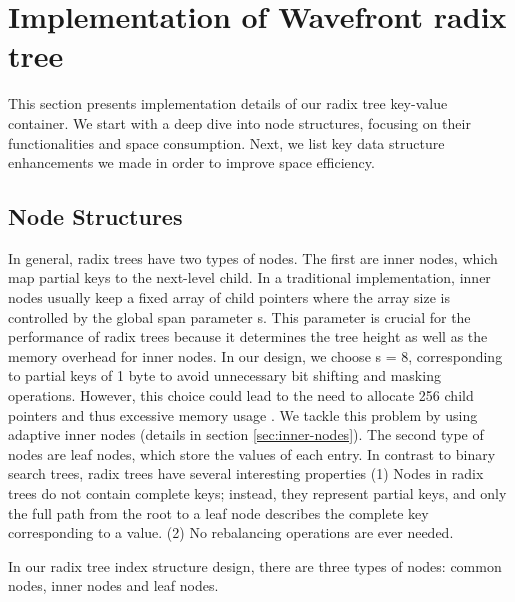 \documentclass[sigplan,screen,nonacm]{acmart}
\begin{document}
\section{Implementation of Wavefront radix tree}
This section presents implementation details of our radix tree key-value container. We start with a deep dive into node structures, focusing on their functionalities and space consumption. Next, we list key data structure enhancements we made in order to improve space efficiency.

\subsection{Node Structures}
In general, radix trees have two types of nodes. The first are inner nodes, which map partial keys to the next-level child. In a traditional implementation, inner nodes usually keep a fixed array of child pointers where the array size is controlled by the global span parameter s. This parameter is crucial for the performance of radix trees because it determines the tree height as well as the memory overhead for inner nodes. In our design, we choose s = 8, corresponding to partial keys of 1 byte to avoid unnecessary bit shifting and masking operations. However, this choice could lead to the need to allocate 256 child pointers and thus excessive memory usage \cite{boehm2011efficient}.  We tackle this problem by using adaptive inner nodes (details in section \ref{sec:inner-nodes}). The second type of nodes are leaf nodes, which store the values of each entry. In contrast to binary search trees, radix trees have several interesting properties (1) Nodes in radix trees do not contain complete keys; instead, they represent partial keys, and only the full path from the root to a leaf node describes the complete key corresponding to a value. (2) No rebalancing operations are ever needed. 

In our radix tree index structure design, there are three types of nodes:  common nodes, inner nodes and leaf nodes. 
\end{document}
